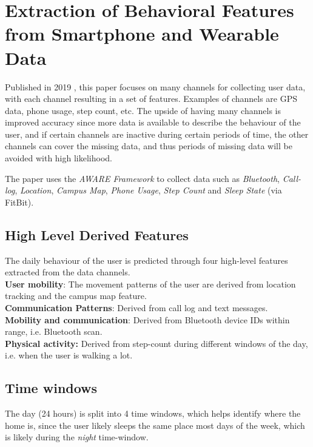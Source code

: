 \section{Extraction of Behavioral Features from Smartphone and Wearable Data}
Published in 2019 \cite{extraction-of-behavioural-features}, this paper focuses on many channels for collecting user data, with each channel resulting in a set of features. Examples of channels are GPS data, phone usage, step count, etc. The upside of having many channels is improved accuracy since more data is available to describe the behaviour of the user, and if certain channels are inactive during certain periods of time, the other channels can cover the missing data, and thus periods of missing data will be avoided with high likelihood. 

The paper uses the \textit{AWARE Framework }\cite{aware2015} to collect data such as  \textit{Bluetooth}, \textit{Call-log}, \textit{Location}, \textit{Campus Map}, \textit{Phone Usage}, \textit{Step Count} and \textit{Sleep State} (via FitBit).

\subsection{High Level Derived Features}
The daily behaviour of the user is predicted through four high-level features extracted from the data channels.\\

\textbf{User mobility}: The movement patterns of the user are derived from location tracking and the campus map feature.\\ 

\textbf{Communication Patterns}: Derived from call log and text messages.\\

\textbf{Mobility and communication}: Derived from Bluetooth device IDs within range, i.e. Bluetooth scan.\\

\textbf{Physical activity:} Derived from step-count during different windows of the day, i.e. when the user is walking a lot.\\

\subsection{Time windows}
The day (24 hours) is split into 4 time windows, which helps identify where the home is, since the user likely sleeps the same place most days of the week, which is likely during the \textit{night} time-window.

